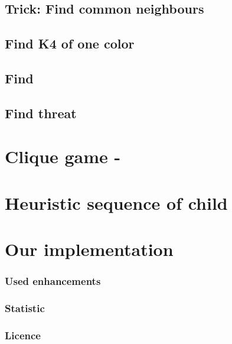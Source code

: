 \subsection{ Trick: Find common neighbours }

\subsection{ Find K4 of one color }

\subsection{ Find  }

\subsection{ Find threat }

\section{ Clique game -  }

\section{ Heuristic sequence of child }

\section{ Our implementation }


\subsubsection{ Used enhancements }

\subsubsection{ Statistic }

\subsubsection{ Licence }





